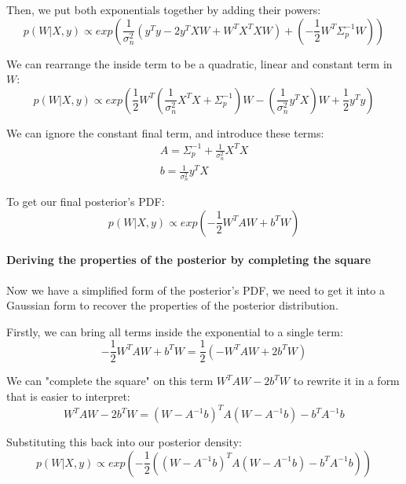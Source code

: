 \documentclass[10pt]{article}
\begin{document}
Then, we put both exponentials together by adding their powers:
\begin{equation*}
    p(W|X,y) \propto exp\left(\frac{1}{\sigma^2_n}(y^Ty - 2y^TXW + W^TX^TXW) + \left(-\frac{1}{2}W^T\Sigma_p^{-1}W\right)\right)
\end{equation*}

We can rearrange the inside term to be a quadratic, linear and constant term in $W$:
\begin{equation*}
    p(W|X,y) \propto exp\left(\frac{1}{2}W^T\left(\frac{1}{\sigma^2_n}X^TX + \Sigma_p^{-1}\right)W - \left(\frac{1}{\sigma^2_n}y^TX\right)W + \frac{1}{2}y^Ty\right)
\end{equation*}

We can ignore the constant final term, and introduce these terms:
\begin{equation} \label{eq:A_b}
    \begin{aligned}
        A = \Sigma_p^{-1} + \frac{1}{\sigma^2_n}X^TX \\
        b = \frac{1}{\sigma^2_n}y^TX
    \end{aligned}
\end{equation}

To get our final posterior's PDF:
\begin{equation*}
    p(W|X,y) \propto exp\left(-\frac{1}{2}W^TAW + b^TW\right)
\end{equation*}

\paragraph{Deriving the properties of the posterior by completing the square}
Now we have a simplified form of the posterior's PDF, we need to get it into a Gaussian form to recover the properties of the posterior distribution.

Firstly, we can bring all terms inside the exponential to a single term:
\begin{equation*}
    -\frac{1}{2}W^TAW + b^TW = \frac{1}{2}\left(-W^TAW + 2b^TW\right)
\end{equation*}

We can "complete the square" on this term $W^TAW - 2b^TW$ to rewrite it in a form that is easier to interpret:
\begin{equation*}
    W^TAW - 2b^TW = (W - A^{-1}b)^TA(W - A^{-1}b) - b^TA^{-1}b
\end{equation*}

Substituting this back into our posterior density:
\begin{equation*}
    p(W|X,y) \propto exp\left(-\frac{1}{2}\left((W - A^{-1}b)^TA(W - A^{-1}b) - b^TA^{-1}b\right)\right)
\end{equation*}
\end{document}
